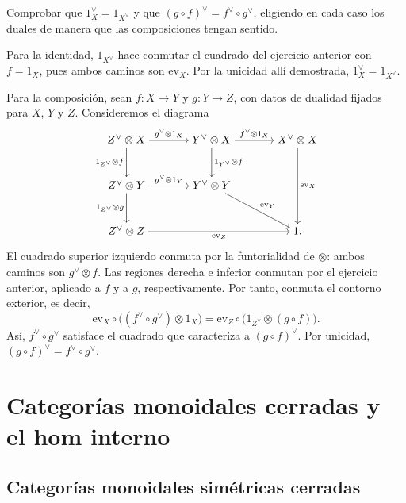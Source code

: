 \begin{ejer}
Comprobar que $1_X^\vee=1_{X^\vee}$ y que $(g\circ f)^\vee=f^\vee\circ g^\vee$, eligiendo en cada caso los duales de manera que las composiciones tengan sentido.
\end{ejer}
\begin{sol}
Para la identidad, $1_{X^\vee}$ hace conmutar el cuadrado del ejercicio anterior con $f=1_X$, pues ambos caminos son $\mathrm{ev}_X$. Por la unicidad allí demostrada, $1_X^\vee=1_{X^\vee}$.

Para la composición, sean $f\colon X\to Y$ y $g\colon Y\to Z$, con datos de dualidad fijados para $X$, $Y$ y $Z$. Consideremos el diagrama
\[
\begin{tikzcd}[column sep=large,row sep=large,cramped]
Z^\vee\otimes X
    \arrow[r,"g^\vee\otimes1_X"]
    \arrow[d,"1_{Z^\vee}\otimes f"']
& Y^\vee\otimes X
    \arrow[r,"f^\vee\otimes1_X"]
    \arrow[d,"1_{Y^\vee}\otimes f"]
& X^\vee\otimes X
    \arrow[dd,"\mathrm{ev}_X"]
\\
Z^\vee\otimes Y
    \arrow[r,"g^\vee\otimes1_Y"]
    \arrow[d,"1_{Z^\vee}\otimes g"']
& Y^\vee\otimes Y
    \arrow[dr,"\mathrm{ev}_Y"]
&
\\
Z^\vee\otimes Z
    \arrow[rr,"\mathrm{ev}_Z"']
&& 1.
\end{tikzcd}
\]
El cuadrado superior izquierdo conmuta por la funtorialidad de $\otimes$: ambos caminos son $g^\vee\otimes f$. Las regiones derecha e inferior conmutan por el ejercicio anterior, aplicado a $f$ y a $g$, respectivamente. Por tanto, conmuta el contorno exterior, es decir,
\[
\mathrm{ev}_X\circ\bigl((f^\vee\circ g^\vee)\otimes1_X\bigr)
=\mathrm{ev}_Z\circ\bigl(1_{Z^\vee}\otimes(g\circ f)\bigr).
\]
Así, $f^\vee\circ g^\vee$ satisface el cuadrado que caracteriza a $(g\circ f)^\vee$. Por unicidad, $(g\circ f)^\vee=f^\vee\circ g^\vee$.
\end{sol}


\section{Categorías monoidales cerradas y el hom interno}

\subsection{Categorías monoidales simétricas cerradas}

